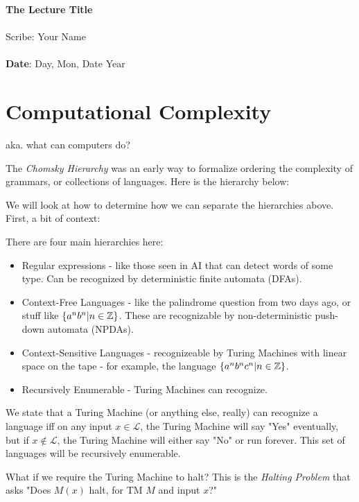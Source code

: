 \documentclass[11pt,twosided]{article}
\def\titlestring{The Lecture Title}
\def\scribestring{Your Name}
\def\datestring{Day, Mon, Date Year}
\begin{document}
\thispagestyle{plain}  %

\noindent
{\LARGE \textbf{\titlestring}}\\\\
%
{\Large Scribe: \scribestring}\\ \\
{\textbf{Date}: \datestring}


\noindent

\section{Computational Complexity}
aka. what can computers do? 

The \textit{Chomsky Hierarchy} was an early way to formalize ordering the complexity of grammars, or collections of languages. Here is the hierarchy below: 



We will look at how to determine how we can separate the hierarchies above. First, a bit of context: 

There are four main hierarchies here: 
\begin{itemize}
\item Regular expressions - like those seen in AI that can detect words of some type. Can be recognized by deterministic finite automata (DFAs).
\item Context-Free Languages - like the palindrome question from two days ago, or stuff like $\{a^n b^n | n \in \mathbb Z\}$. These are recognizable by non-deterministic push-down automata (NPDAs). 
\item Context-Sensitive Languages - recognizeable by Turing Machines with linear space on the tape - for example, the language $\{ a^n b^n c^n | n \in \mathbb Z \}$. 
\item Recursively Enumerable - Turing Machines can recognize. 
\end{itemize}

We state that a Turing Machine (or anything else, really) can recognize a language iff on any input $x \in \mathcal{L}$, the Turing Machine will say "Yes" eventually, but if $x \not \in \mathcal{L}$, the Turing Machine will either say "No" or run forever. This set of languages will be recursively enumerable. 

What if we require the Turing Machine to halt? This is the \textit{Halting Problem} that asks "Does $M(x)$ halt, for TM $M$ and input $x$?" 
\end{document}
